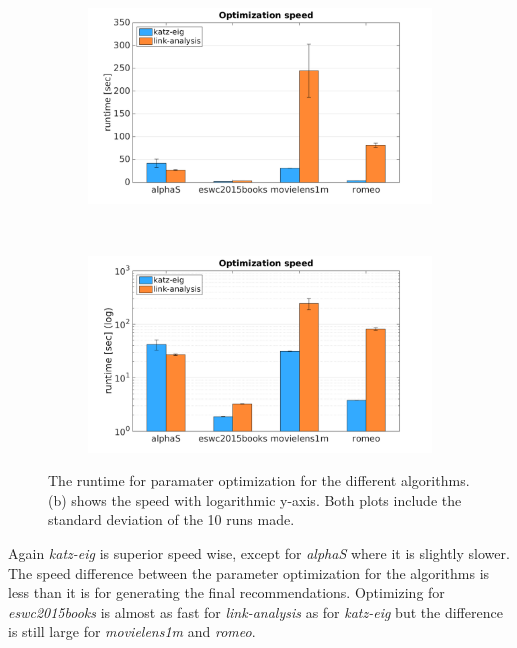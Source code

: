 \begin{figure}[h!]
    \begin{subfigure}[h!]{0.5\textwidth}
        \includegraphics[width=\textwidth]{fig/comp/comp_rec_opt_time.png}
        \caption{}
    \end{subfigure}
    ~
    \begin{subfigure}[h!]{0.5\textwidth}
        \includegraphics[width=\textwidth]{fig/comp/comp_rec_opt_time_log.png}
        \caption{}
    \end{subfigure}
    \caption{The runtime for paramater optimization for the different algorithms. (b) shows the speed with logarithmic y-axis. Both plots include the standard deviation of the 10 runs made.}
    \label{fig:opt_speed}
\end{figure}

\FloatBarrier

Again \textit{katz-eig} is superior speed wise, except for \textit{alphaS} where it is slightly slower. The speed difference between the parameter optimization for the algorithms is less than it is for generating the final recommendations. Optimizing for \textit{eswc2015books} is almost as fast for \textit{link-analysis} as for \textit{katz-eig} but the difference is still large for \textit{movielens1m} and \textit{romeo}.


